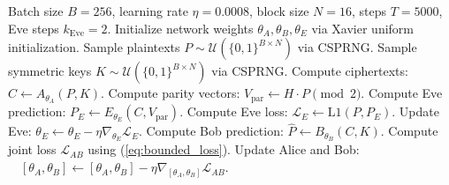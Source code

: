 \documentclass[journal,10pt,twocolumn]{IEEEtran}
\begin{document}
\begin{algorithm}[t]
\caption{NeuroCrypt-Guard Asymmetric Minimax Training}
\label{alg:training}
\begin{algorithmic}[1]
\Require Batch size $B=256$, learning rate $\eta = 0.0008$, block size $N=16$, steps $T=5000$, Eve steps $k_{\text{Eve}}=2$.
\State Initialize network weights $\theta_A, \theta_B, \theta_E$ via Xavier uniform initialization.
    \State Sample plaintexts $P \sim \mathcal{U}(\{0, 1\}^{B \times N})$ via CSPRNG.
    \State Sample symmetric keys $K \sim \mathcal{U}(\{0, 1\}^{B \times N})$ via CSPRNG.
    \State Compute ciphertexts: $C \leftarrow A_{\theta_A}(P, K)$.
    \State Compute parity vectors: $V_{\text{par}} \leftarrow H \cdot P \pmod 2$.
        \State Compute Eve prediction: $P_E \leftarrow E_{\theta_E}(C, V_{\text{par}})$.
        \State Compute Eve loss: $\mathcal{L}_E \leftarrow \text{L1}(P, P_E)$.
        \State Update Eve: $\theta_E \leftarrow \theta_E - \eta \nabla_{\theta_E} \mathcal{L}_E$.
    \EndFor
    \State Compute Bob prediction: $\hat{P} \leftarrow B_{\theta_B}(C, K)$.
    \State Compute joint loss $\mathcal{L}_{AB}$ using (\ref{eq:bounded_loss}).
    \State Update Alice and Bob: 
    \State $\quad [\theta_A, \theta_B] \leftarrow [\theta_A, \theta_B] - \eta \nabla_{[\theta_A, \theta_B]} \mathcal{L}_{AB}$.
\EndFor
\end{algorithmic}
\end{algorithm}

\end{document}
